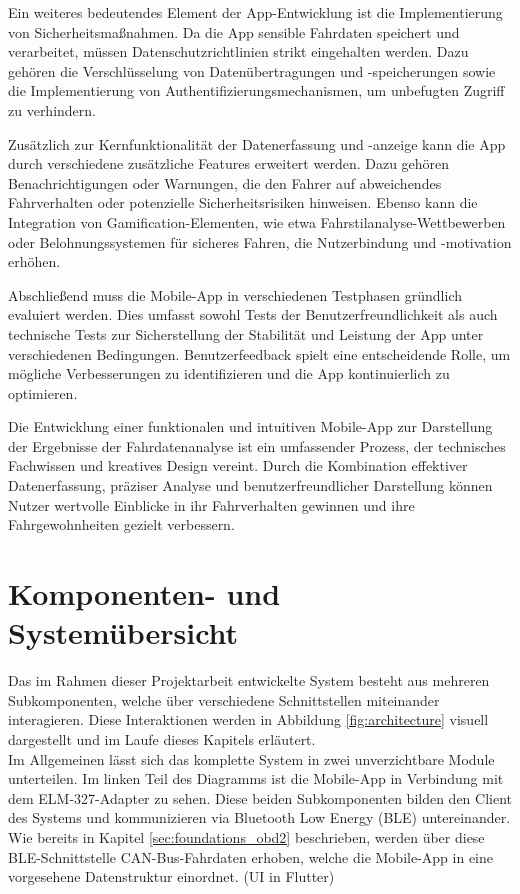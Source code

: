 \documentclass[oneside]{ausarbeitung}
\begin{document}
\begin{itemize}
  Ein weiteres bedeutendes Element der App-Entwicklung ist die Implementierung von Sicherheitsmaßnahmen. Da die App sensible Fahrdaten speichert und verarbeitet, müssen Datenschutzrichtlinien strikt eingehalten werden. Dazu gehören die Verschlüsselung von Datenübertragungen und -speicherungen sowie die Implementierung von Authentifizierungsmechanismen, um unbefugten Zugriff zu verhindern.
  
  Zusätzlich zur Kernfunktionalität der Datenerfassung und -anzeige kann die App durch verschiedene zusätzliche Features erweitert werden. Dazu gehören Benachrichtigungen oder Warnungen, die den Fahrer auf abweichendes Fahrverhalten oder potenzielle Sicherheitsrisiken hinweisen. Ebenso kann die Integration von Gamification-Elementen, wie etwa Fahrstilanalyse-Wettbewerben oder Belohnungssystemen für sicheres Fahren, die Nutzerbindung und -motivation erhöhen.
  
  Abschließend muss die Mobile-App in verschiedenen Testphasen gründlich evaluiert werden. Dies umfasst sowohl Tests der Benutzerfreundlichkeit als auch technische Tests zur Sicherstellung der Stabilität und Leistung der App unter verschiedenen Bedingungen. Benutzerfeedback spielt eine entscheidende Rolle, um mögliche Verbesserungen zu identifizieren und die App kontinuierlich zu optimieren.
  
  Die Entwicklung einer funktionalen und intuitiven Mobile-App zur Darstellung der Ergebnisse der Fahrdatenanalyse ist ein umfassender Prozess, der technisches Fachwissen und kreatives Design vereint. Durch die Kombination effektiver Datenerfassung, präziser Analyse und benutzerfreundlicher Darstellung können Nutzer wertvolle Einblicke in ihr Fahrverhalten gewinnen und ihre Fahrgewohnheiten gezielt verbessern.
\end{itemize}

\newpage
\section{Komponenten- und Systemübersicht}
\label{sec:implement_components}

Das im Rahmen dieser Projektarbeit entwickelte System besteht aus mehreren Subkomponenten, welche über verschiedene Schnittstellen miteinander interagieren. Diese Interaktionen werden in Abbildung {\ref{fig:architecture}} visuell dargestellt und im Laufe dieses Kapitels erläutert. 
\\
Im Allgemeinen lässt sich das komplette System in zwei unverzichtbare Module unterteilen. Im linken Teil des Diagramms ist die Mobile-App in Verbindung mit dem ELM-327-Adapter zu sehen. Diese beiden Subkomponenten bilden den Client des Systems und kommunizieren via Bluetooth Low Energy (BLE) untereinander.
Wie bereits in Kapitel {\ref{sec:foundations_obd2}} beschrieben, werden über diese BLE-Schnittstelle CAN-Bus-Fahrdaten erhoben, welche die Mobile-App in eine vorgesehene Datenstruktur einordnet.
(UI in Flutter)
\end{document}
